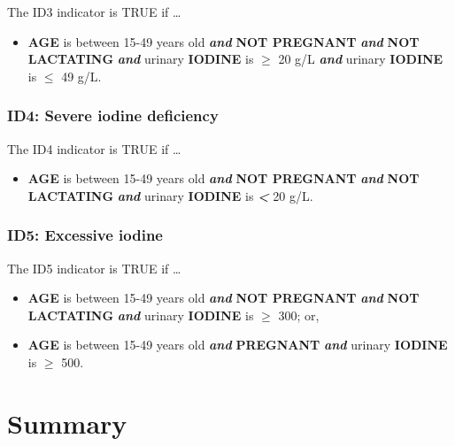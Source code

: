\documentclass[12pt,a4paper]{article}
\providecommand{\tightlist}{%
  \setlength{\itemsep}{0pt}\setlength{\parskip}{0pt}}
\begin{document}
The ID3 indicator is TRUE if \ldots{}

\begin{itemize}
\tightlist
\item
  \textbf{AGE} is between 15-49 years old \textbf{\emph{and}} \textbf{NOT PREGNANT} \textbf{\emph{and}} \textbf{NOT LACTATING} \textbf{\emph{and}} urinary \textbf{IODINE} is \textbf{\emph{\(\geq\)}} 20 g/L \textbf{\emph{and}} urinary \textbf{IODINE} is \textbf{\emph{\(\leq\)}} 49 g/L.
\end{itemize}

\hypertarget{id4-severe-iodine-deficiency}{%
\subsubsection{ID4: Severe iodine deficiency}\label{id4-severe-iodine-deficiency}}

The ID4 indicator is TRUE if \ldots{}

\begin{itemize}
\tightlist
\item
  \textbf{AGE} is between 15-49 years old \textbf{\emph{and}} \textbf{NOT PREGNANT} \textbf{\emph{and}} \textbf{NOT LACTATING} \textbf{\emph{and}} urinary \textbf{IODINE} is \textbf{\emph{\textless{}}} 20 g/L.
\end{itemize}

\hypertarget{id5-excessive-iodine}{%
\subsubsection{ID5: Excessive iodine}\label{id5-excessive-iodine}}

The ID5 indicator is TRUE if \ldots{}

\begin{itemize}
\item
  \textbf{AGE} is between 15-49 years old \textbf{\emph{and}} \textbf{NOT PREGNANT} \textbf{\emph{and}} \textbf{NOT LACTATING} \textbf{\emph{and}} urinary \textbf{IODINE} is \textbf{\emph{\(\geq\)}} 300; or,
\item
  \textbf{AGE} is between 15-49 years old \textbf{\emph{and}} \textbf{PREGNANT} \textbf{\emph{and}} urinary \textbf{IODINE} is \textbf{\emph{\(\geq\)}} 500.
\end{itemize}

\hypertarget{summary}{%
\section{Summary}\label{summary}}
\end{document}
